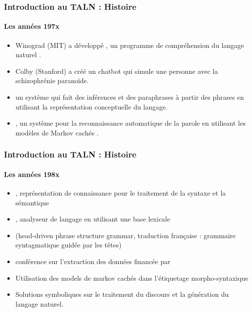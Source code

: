 \documentclass{beamer}
\begin{document}
\begin{frame}
\frametitle{Introduction au TALN : Histoire}
\framesubtitle{Les années 197x}

\begin{itemize}
	\item {} Winograd (MIT) a développé , un programme de compréhension du langage naturel \cite{1971-winograd}.
	\item {} Colby (Stanford) a créé  un chatbot qui simule une personne avec la schizophrénie paranoïde.
	\item {}  un système qui fait des inférences et des paraphrases à partir des phrases en utilisant la représentation conceptuelle du langage. 
	\item {} , un système pour la reconnaissance automatique de la parole en utilisant les modèles de Markov cachés \cite{1975-baker}.
\end{itemize}

\end{frame}

\begin{frame}
\frametitle{Introduction au TALN : Histoire}
\framesubtitle{Les années 198x}

\begin{itemize}
	\item {} , représentation de connaissance pour le traitement de la syntaxe et la sémantique \cite{1980-bobrow}
	\item {} , analyseur de langage en utilisant une base lexicale \cite{1986-jacobs}
	\item {}  (head-driven phrase structure grammar, traduction française : grammaire syntagmatique guidée par les têtes) \cite{1987-sag-pollard}
	\item {}  conférence sur l'extraction des données financée par 
	\item {} Utilisation des models de markov cachés dans  l'étiquetage morpho-syntaxique \cite{1988-church}
	\item Solutions symboliques sur le traitement du discours et la génération du langage naturel.
\end{itemize}

\end{frame}
\end{document}
